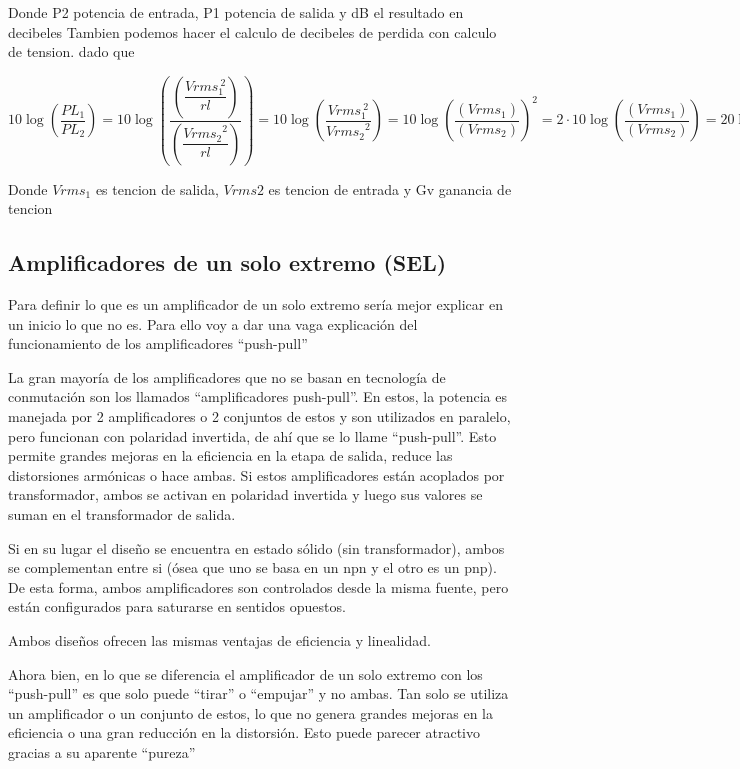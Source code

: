 \documentclass[../main.tex]{subfiles}
\begin{document}
		Donde P2 potencia de entrada, P1 potencia de salida y dB el resultado en decibeles
		Tambien podemos hacer el calculo de decibeles de perdida con calculo de 
		tension. dado que
\begin{center}
		\(
		10\log\left(\dfrac{PL_{1}}{PL_{2}}\right)=
		10\log\left(\dfrac{\left(\dfrac{Vrms_{1}^{\ 2}}{rl}\right)}{\left(\dfrac{{Vrms_{2}}^2} {rl}\right)}\right)=
		10\log\left(\dfrac{Vrms_{1}^{\ 2}}{{Vrms_{2}}^2}\right)=
		10\log\left(\dfrac{\left(Vrms_{1}^{\ }\right)}{\left(Vrms_{2}\right)}\right)^{2}=
		2\cdot10\log\left(\dfrac{\left(Vrms_{1}^{\ }\right)} {\left(Vrms_{2}\right)}\right)=
		20\log\left(\dfrac{\left(Vrms_{1}^{\ }\right)}{\left(Vrms_{2}\right)}\right)
		\)
	\end{center}
		Donde $Vrms_1$ es tencion de salida, $Vrms2$ es tencion de entrada y Gv ganancia de tencion

	\subsection{Amplificadores de un solo extremo (SEL)}
	Para definir lo que es un amplificador de un solo extremo sería mejor explicar 
	en un inicio lo que no es. Para ello voy a dar una vaga explicación del 
	funcionamiento de los amplificadores ``push-pull'' 

	La gran mayoría de los amplificadores que no se basan en tecnología de conmutación 
	son los llamados ``amplificadores push-pull''. En estos, la potencia es manejada por 
	2 amplificadores o 2 conjuntos de estos y son utilizados en paralelo, pero 
	funcionan con polaridad invertida, de ahí que se lo llame ``push-pull''. Esto 
	permite grandes mejoras en la eficiencia en la etapa de salida, reduce las 
	distorsiones armónicas o hace ambas. Si estos amplificadores están acoplados por 
	transformador, ambos se activan en polaridad invertida y luego sus valores se 
	suman en el transformador de salida.

	Si en su lugar el diseño se encuentra en estado sólido (sin transformador), ambos 
	se complementan entre si (ósea que uno se basa en un npn y el otro es un pnp). De 
	esta forma, ambos amplificadores son controlados desde la misma fuente, pero están 
	configurados para saturarse en sentidos opuestos.

	Ambos diseños ofrecen las mismas ventajas de eficiencia y linealidad. 

	Ahora bien, en lo que se diferencia el amplificador de un solo extremo con los 
	``push-pull'' es que solo puede ``tirar'' o ``empujar'' y no ambas. Tan solo se utiliza 
	un amplificador o un conjunto de estos, lo que no genera grandes mejoras en la 
	eficiencia o una gran reducción en la distorsión. Esto puede parecer atractivo 
	gracias a su aparente ``pureza''
\end{document}

